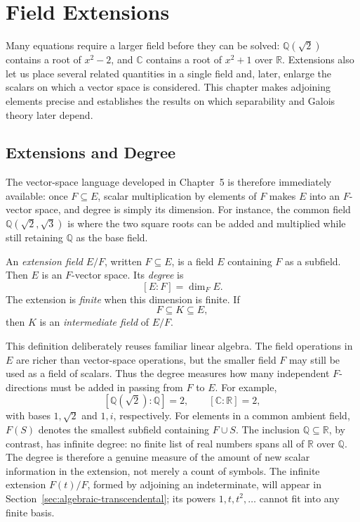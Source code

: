 \chapter{Field Extensions}

Many equations require a larger field before they can be solved:
\(\mathbb Q(\sqrt2)\) contains a root of \(x^2-2\), and \(\mathbb C\)
contains a root of \(x^2+1\) over \(\mathbb R\).  Extensions also let us
place several related quantities in a single field and, later, enlarge the
scalars on which a vector space is considered.  This chapter makes adjoining
elements precise and establishes the results on which separability and Galois
theory later depend.

\section{Extensions and Degree}\label{sec:extensions-degree}
The vector-space language developed in Chapter~5 is therefore immediately
available: once \(F\subseteq E\), scalar multiplication by elements of \(F\)
makes \(E\) into an \(F\)-vector space, and degree is simply its dimension.
For instance, the common field \(\mathbb Q(\sqrt2,\sqrt3)\) is where the two
square roots can be added and multiplied while still retaining
\(\mathbb Q\) as the base field.

\begin{definition}
An \emph{extension field} \(E/F\), written \(F\subseteq E\), is a field
\(E\) containing \(F\) as a subfield.  Then \(E\) is an \(F\)-vector space.
Its \emph{degree} is
\[
[E:F]=\dim_F E.
\]
The extension is \emph{finite} when this dimension is finite.
\; If
\[
F\subseteq K\subseteq E,
\]
then \(K\) is an \emph{intermediate field} of \(E/F\).
\end{definition}

This definition deliberately reuses familiar linear algebra.  The field
operations in \(E\) are richer than vector-space operations, but the smaller
field \(F\) may still be used as a field of scalars.  Thus the degree measures
how many independent \(F\)-directions must be added in passing from \(F\) to
\(E\).  For example,
\[
[\mathbb Q(\sqrt2):\mathbb Q]=2,
\qquad
[\mathbb C:\mathbb R]=2,
\]
with bases \(1,\sqrt2\) and \(1,i\), respectively.  For elements in a common
ambient field, \(F(S)\) denotes the smallest subfield containing \(F\cup S\).
The inclusion \(\mathbb Q\subseteq\mathbb R\), by contrast, has infinite
degree: no finite list of real numbers spans all of \(\mathbb R\) over
\(\mathbb Q\).  The degree is therefore a genuine measure of the amount of
new scalar information in the extension, not merely a count of symbols.
The infinite extension \(F(t)/F\), formed by adjoining an indeterminate, will
appear in Section~\ref{sec:algebraic-transcendental}; its powers
\(1,t,t^2,\ldots\) cannot fit into any finite
basis.

